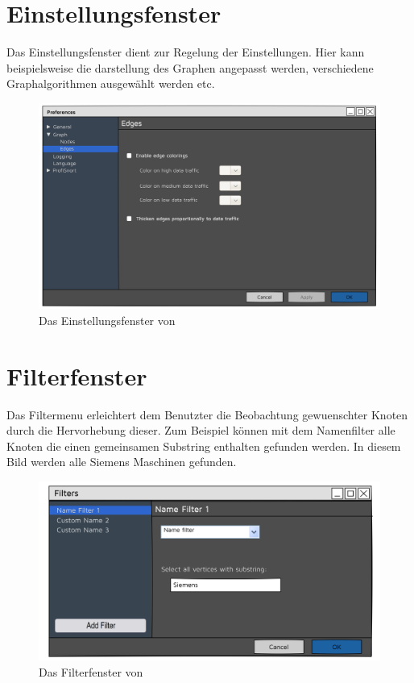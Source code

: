 \section{Einstellungsfenster}
Das Einstellungsfenster dient zur Regelung der Einstellungen. Hier kann
beispielsweise die darstellung des Graphen angepasst werden, verschiedene
Graphalgorithmen ausgewählt werden etc.

  \begin{figure}[h!]
    \hspace*{0.3cm}\includegraphics[scale=0.07]{./img/Preferences.png}
    \caption{Das Einstellungsfenster von \programname}
  \end{figure}

\newpage
\section{Filterfenster}
Das Filtermenu erleichtert dem Benutzter die Beobachtung gewuenschter Knoten
durch die Hervorhebung dieser. Zum Beispiel können mit dem Namenfilter alle
Knoten die einen gemeinsamen Substring enthalten gefunden werden. In diesem
Bild werden alle Siemens Maschinen gefunden.

\begin{figure}[h!]
  \hspace*{0.2cm}\includegraphics[scale=0.06]{./img/Filters.png}
  \caption{Das Filterfenster von \programname}
\end{figure}
